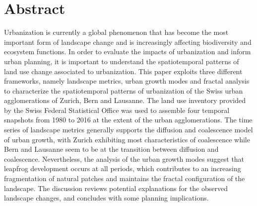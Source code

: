 \documentclass[10pt,letterpaper]{article}
\begin{document}
\section*{Abstract}
Urbanization is currently a global phenomenon that has become the most important form of landscape change and is increasingly affecting biodiversity and ecosystem functions.
In order to evaluate the impacts of urbanization and inform urban planning, it is important to understand the spatiotemporal patterns of land use change associated to urbanization.
This paper exploits three different frameworks, namely landscape metrics, urban growth modes and fractal analysis to characterize the spatiotemporal patterns of urbanization of the Swiss urban agglomerations of Zurich, Bern and Lausanne.
The land use inventory provided by the Swiss Federal Statistical Office was used to assemble four temporal snapshots from 1980 to 2016 at the extent of the urban agglomerations.
The time series of landscape metrics generally supports the diffusion and coalescence model of urban growth, with Zurich exhibiting most characteristics of coalescence while Bern and Lausanne seem to be at the transition between diffusion and coalescence.
Nevertheless, the analysis of the urban growth modes suggest that leapfrog development occurs at all periods, which contributes to an increasing fragmentation of natural patches and maintains the fractal configuration of the landscape.
The discussion reviews potential explanations for the observed landscape changes, and concludes with some planning implications.
\end{document}
